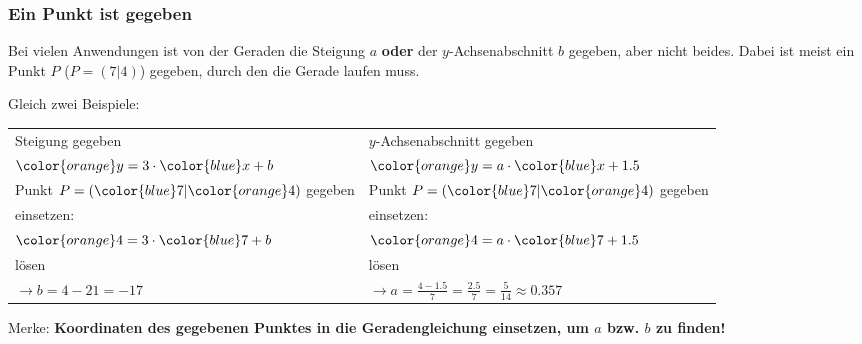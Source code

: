 
\subsubsection{Ein Punkt ist gegeben}
Bei vielen Anwendungen ist von der Geraden die Steigung $a$
\textbf{oder} der $y$-Achsenabschnitt $b$ gegeben, aber nicht
beides. Dabei ist meist ein Punkt $P$ (\zB $P=(7|4)$) gegeben, durch
den die Gerade laufen muss.

Gleich zwei Beispiele:

\begin{tabular}{p{8cm}|p{8cm}}
  Steigung gegeben & $y$-Achsenabschnitt gegeben \\
  ${\color{orange}y}=3\cdot{}{\color{blue}x}+b$ & ${\color{orange}y}=a\cdot{}{\color{blue}x}+1.5$\\
  \hline
  Punkt $P=({\color{blue}7}|{\color{orange}4})$ gegeben & Punkt $P=({\color{blue}7}|{\color{orange}4})$ gegeben\\
  \hline
  einsetzen: & einsetzen: \\
  ${\color{orange}4} = 3\cdot{}{\color{blue}7} + b$ & ${\color{orange}4}=a\cdot{}{\color{blue}7} + 1.5$\\
  \hline
  lösen & lösen\\
  $\longrightarrow b=4-21=-17$ & $\longrightarrow a=\frac{4-1.5}{7} =\frac{2.5}{7}=\frac{5}{14} \approx{} 0.357$

  \end{tabular}


Merke: \textbf{Koordinaten des gegebenen Punktes in die
  Geradengleichung einsetzen, um $a$ bzw. $b$ zu finden!}

